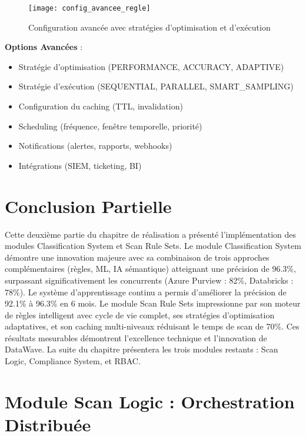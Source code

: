 \begin{figure}[htpb]
\centering
\texttt{[image: config\_avancee\_regle]}
\caption{Configuration avancée avec stratégies d'optimisation et d'exécution}
\label{fig:config_avancee_regle}
\end{figure}

\textbf{Options Avancées} :
\begin{itemize}
    \item Stratégie d'optimisation (PERFORMANCE, ACCURACY, ADAPTIVE)
    \item Stratégie d'exécution (SEQUENTIAL, PARALLEL, SMART\_SAMPLING)
    \item Configuration du caching (TTL, invalidation)
    \item Scheduling (fréquence, fenêtre temporelle, priorité)
    \item Notifications (alertes, rapports, webhooks)
    \item Intégrations (SIEM, ticketing, BI)
\end{itemize}

\section*{Conclusion Partielle}

Cette deuxième partie du chapitre de réalisation a présenté l'implémentation des modules Classification System et Scan Rule Sets. Le module Classification System démontre une innovation majeure avec sa combinaison de trois approches complémentaires (règles, ML, IA sémantique) atteignant une précision de 96.3\%, surpassant significativement les concurrents (Azure Purview : 82\%, Databricks : 78\%). Le système d'apprentissage continu a permis d'améliorer la précision de 92.1\% à 96.3\% en 6 mois. Le module Scan Rule Sets impressionne par son moteur de règles intelligent avec cycle de vie complet, ses stratégies d'optimisation adaptatives, et son caching multi-niveaux réduisant le temps de scan de 70\%. Ces résultats mesurables démontrent l'excellence technique et l'innovation de DataWave. La suite du chapitre présentera les trois modules restants : Scan Logic, Compliance System, et RBAC.



\section{Module Scan Logic : Orchestration Distribuée}

